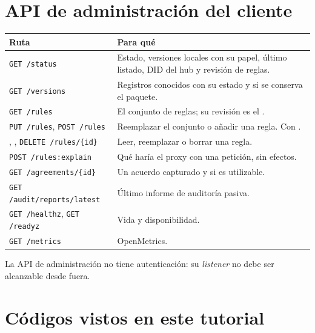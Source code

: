 \section{API de administración del cliente}

\noindent\begin{tabularx}{\linewidth}{@{}L{5.6cm}Y@{}}
\toprule
\textbf{Ruta} & \textbf{Para qué} \\
\midrule
\texttt{GET /\allowbreak{}status} & Estado, versiones locales con su papel, último listado, DID del hub y revisión de reglas. \\
\texttt{GET /\allowbreak{}versions} & Registros conocidos con su estado y si se conserva el paquete. \\
\texttt{GET /\allowbreak{}rules} & El conjunto de reglas; su revisión es el . \\
\texttt{PUT /\allowbreak{}rules}, \texttt{POST /\allowbreak{}rules} & Reemplazar el conjunto o añadir una regla. Con . \\
, , \texttt{DELETE /\allowbreak{}rules/\allowbreak{}\{id\}} & Leer, reemplazar o borrar una regla. \\
\texttt{POST /\allowbreak{}rules:explain} & Qué haría el proxy con una petición, sin efectos. \\
\texttt{GET /\allowbreak{}agreements/\allowbreak{}\{id\}} & Un acuerdo capturado y si es utilizable. \\
\texttt{GET /\allowbreak{}audit/\allowbreak{}reports/\allowbreak{}latest} & Último informe de auditoría pasiva. \\
\texttt{GET /\allowbreak{}healthz}, \texttt{GET /\allowbreak{}readyz} & Vida y disponibilidad. \\
\texttt{GET /\allowbreak{}metrics} & OpenMetrics. \\
\bottomrule
\end{tabularx}

\medskip
La API de administración no tiene autenticación: su \emph{listener} no debe ser alcanzable desde fuera.

\section{Códigos vistos en este tutorial}

